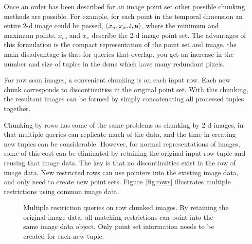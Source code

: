 \documentclass{sig-alternate}
\begin{document}
Once an order has been described for an image point set other possible
chunking methods are possible.  For example, for each point in the
temporal dimension an entire 2-d image could be passed,
$(x_n,x_x,t,{\bf{a}})$, where the minimum and maximum points, $x_n$, and
$x_x$ describe the 2-d image point set.  The advantages of this
formulation is the compact representation of the point set and image.
the main disadvantage is that for queries that overlap, you get an
increase in the number and size of tuples in the \ac{dsms} which have
many redundant pixels.

For row scan images, a convenient chunking is on each input row.  Each
new chunk corresponds to discontinuities in the original point set.
With this chunking, the resultant images can be formed by simply
concatenating all processed tuples together.

Chunking by rows has some of the same problems as chunking by 2-d
images, in that multiple queries can replicate much of the data, and
the time in creating new tuples can be considerable.  However, for
normal representations of images, some of this cost can be eliminated
by retaining the original input row tuple and reusing that image data.
The key is that no discontinuities exist in the row of image data.
New restricted rows can use pointers into the existing image data, and
only need to create new point sets.  Figure~\ref{fig:rows} illustrates
multiple restrictions using common image data.

\begin{figure}[htbp]
  \centering
\quad
 \caption{%
   Multiple restriction queries on row chunked images.  By retaining
   the original image data, all matching restrictions can point into
   the same image data object.  Only point set information needs to be
   created for each new tuple.}
 \label{fig:chunk}
\end{figure}
\end{document}
